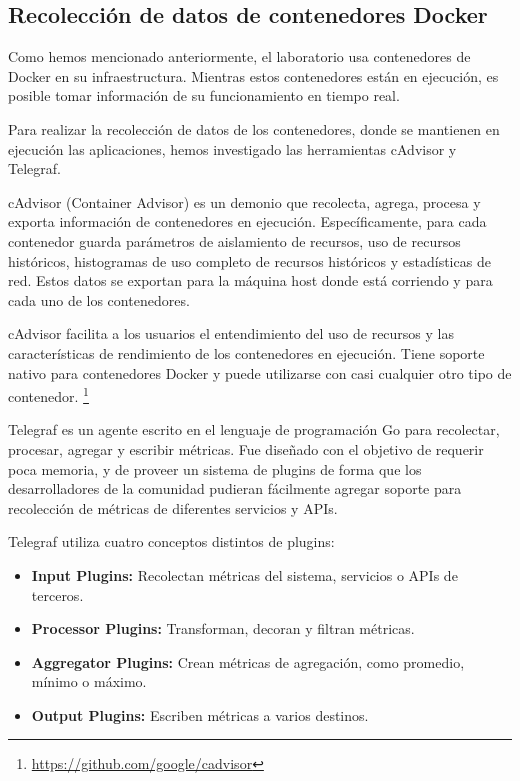 \subsection{Recolección de datos de contenedores Docker}
\label{aplicaciones}
 
Como hemos mencionado anteriormente, el laboratorio usa contenedores de Docker en su infraestructura. Mientras estos contenedores están en ejecución, es posible tomar información de su funcionamiento en tiempo real.

Para realizar la recolección de datos de los contenedores, donde se mantienen en ejecución las aplicaciones, hemos investigado las herramientas cAdvisor y Telegraf. 

cAdvisor (Container Advisor) es un demonio que recolecta, agrega, procesa y exporta información de contenedores en ejecución. Específicamente, para cada contenedor guarda parámetros de aislamiento de recursos, uso de recursos históricos, histogramas de uso completo de recursos históricos y estadísticas de red. Estos datos se exportan para la máquina host donde está corriendo y para cada uno de los contenedores.

cAdvisor facilita a los usuarios el entendimiento del uso de recursos y las características de rendimiento de los contenedores en ejecución. Tiene soporte nativo para contenedores Docker y puede utilizarse con casi cualquier otro tipo de contenedor. \footnote{\url{https://github.com/google/cadvisor}}

Telegraf es un agente escrito en el lenguaje de programación Go para recolectar, procesar, agregar y escribir métricas. Fue diseñado con el objetivo de requerir poca memoria, y de proveer un sistema de plugins de forma que los desarrolladores de la comunidad pudieran fácilmente agregar soporte para recolección de métricas de diferentes servicios y APIs.

Telegraf utiliza cuatro conceptos distintos de plugins:

\begin{itemize}

  \item \textbf{Input Plugins:}
  Recolectan métricas del sistema, servicios o APIs de terceros.

  \item \textbf{Processor Plugins:}
  Transforman, decoran y filtran métricas.

  \item \textbf{Aggregator Plugins:}
  Crean métricas de agregación, como promedio, mínimo o máximo.

  \item \textbf{Output Plugins:}
  Escriben métricas a varios destinos.

\end{itemize}

